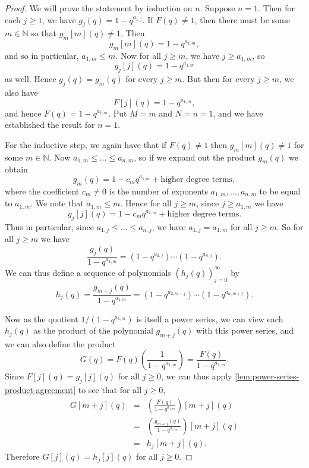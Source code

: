 \documentclass[10pt,a4paper]{amsart}
\newcommand{\N}{\mathbb{N}}
\begin{document}
\begin{proof}
	We will prove the statement by induction on $n$. 
	Suppose $n = 1$. Then for each $j \geq 1$, we have $
	g_j(q) = 1 - q^{a_{1,j}}$.
	If $F(q) \neq 1$, then there must be some $m \in \N$ so that $g_m[m](q) \neq 1$. Then \[ g_m[m](q) = 1 - q^{a_{1,m}},\] and so in particular, $a_{1,m} \leq m$.
	Now for all $j \geq m$, we have $j \geq a_{1,m}$, so
	\[
	g_j[j](q) = 1 - q^{a_{1,m}}
	\]
	as well. Hence $g_j(q) = g_m(q)$ for every $j \geq m$. But then for every $j \geq m$, we also have
	\[
	F[j](q) = 1 - q^{a_{1,m}},
	\]
	and hence $F(q) = 1 - q^{a_{1,m}}$. Put $M = m$ and $N = n = 1$, and we have established the result for $n = 1$.
	
	For the inductive step, we again have that if $F(q) \neq 1$ then $g_m[m](q) \neq 1$ for some $m \in \N$. Now $a_{1,m} \leq \dots \leq a_{n,m}$, so if we expand out the product $g_m(q)$ we obtain
	\[
	g_m(q) = 1 - c_m q^{a_{1,m}} + \mbox{higher degree terms},
	\]
	where the coefficient $c_m \neq 0$ is the number of exponents $a_{1,m},\dots,a_{n,m}$ to be equal to $a_{1,m}$. We note that $a_{1,m} \leq m$. Hence for all $j \geq m$, since $j \geq a_{1,m}$ we have
	\[
	g_j[j](q) = 1 - c_m q^{a_{1,m}} + \mbox{higher degree terms}.
	\]
	Thus in particular, since $a_{1,j} \leq \dots \leq a_{n,j}$, we have $a_{1,j} = a_{1,m}$ for all $j \geq m$.
	So for all $j \geq m$ we have 
	\[
	\frac{g_j(q)}{1-q^{a_{1,m}}} =
	(1 - q^{a_{2,j}})
	\cdots
	(1 - q^{a_{n,j}}).
	\]
	We can thus define a sequence of polynomials $(h_j(q))_{j=0}^\infty$ by
	\[
	h_j(q) = \frac{g_{m+j}(q)}{1-q^{a_{1,m}}} =
	(1 - q^{a_{2,m+j}})
	\cdots
	(1 - q^{a_{n,m+j}}).
	\]
	
	Now as the quotient $1/(1-q^{a_{1,m}})$ 
	is itself a power series, we can view each $h_j(q)$ as the product of the polynomial $g_{m+j}(q)$ with this power series, and we can also define the product 
	\[
	G(q) = F(q) \left(
	\frac{1}{1-q^{a_{1,m}}} \right) = \frac{F(q)}{1-q^{a_{1,m}}}.
	\]
	Since $F[j](q) = g_j[j](q)$ for all $j \geq 0$, we can thus apply \cref{lem:power-series-product-agreement} to see that for all $j \geq 0$, 
	\begin{eqnarray*}
	G[m+j](q)  & = & \left( 
	\frac{F(q)}{1-q^{a_{1,m}}} 
	\right)
	[m+j](q) \\
	& = &
	\left( 
	\frac{g_{m+j}(q)}{1-q^{a_{1,m}}}
	\right)
	[m+j](q) \\ & = & h_j[m+j](q).
	\end{eqnarray*}
	Therefore $G[j](q) = h_j[j](q)$ for all $j \geq 0$. 
	

\end{proof}
\end{document}
